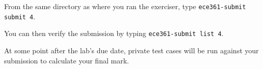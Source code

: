 \documentclass[11pt]{article}
\def\thelab{4}
\begin{document}
From the same directory as where you ran the exerciser, type \texttt{ece361-submit submit \thelab}.

You can then verify the submission by typing \texttt{ece361-submit list \thelab}.

At some point after the lab's due date, private test cases will be run against your submission to calculate your final mark.
\end{document}

